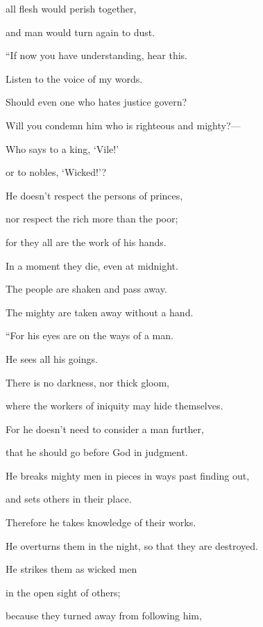 {\par }{\Q {}all flesh would perish together,
\par }{\QB and man would turn again to dust.
\par }{\BB \par }{\Q {}“If now you have understanding, hear this.
\par }{\QB Listen to the voice of my words.
\par }{\Q {}Should even one who hates justice govern?
\par }{\QB Will you condemn him who is righteous and mighty?—
\par }{\Q {}Who says to a king, ‘Vile!’
\par }{\QB or to nobles, ‘Wicked!’?
\par }{\Q {}He doesn’t respect the persons of princes,
\par }{\QB nor respect the rich more than the poor;
\par }{\QB for they all are the work of his hands.
\par }{\Q {}In a moment they die, even at midnight.
\par }{\QB The people are shaken and pass away.
\par }{\QB The mighty are taken away without a hand.
\par }{\BB \par }{\Q {}“For his eyes are on the ways of a man.
\par }{\QB He sees all his goings.
\par }{\Q {}There is no darkness, nor thick gloom,
\par }{\QB where the workers of iniquity may hide themselves.
\par }{\Q {}For he doesn’t need to consider a man further,
\par }{\QB that he should go before God in judgment.
\par }{\Q {}He breaks mighty men in pieces in ways past finding out,
\par }{\QB and sets others in their place.
\par }{\Q {}Therefore he takes knowledge of their works.
\par }{\QB He overturns them in the night, so that they are destroyed.
\par }{\Q {}He strikes them as wicked men
\par }{\QB in the open sight of others;
\par }{\Q {}because they turned away from following him,
}
